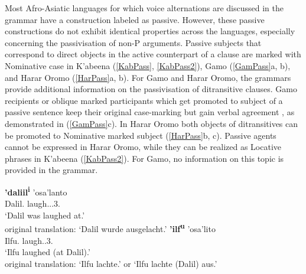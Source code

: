 Most Afro-Asiatic languages for which voice alternations are discussed in the grammar have a construction labeled as passive.
However, these passive constructions do not exhibit identical properties across the languages, especially concerning the passivisation of non-P arguments. 
Passive subjects that correspond to direct objects in the active counterpart of a clause are mark\-ed with Nominative  case in K'abeena (\ref{KabPass}, \ref{KabPass2}), Gamo (\ref{GamPass}a, b), and Harar Oromo (\ref{HarPass}a, b).
For Gamo and Harar Oromo, the grammars provide additional information on the passivisation of ditransitive clauses. 
Gamo recipients or oblique marked participants which get promoted to subject of a passive sentence keep their original case-marking but gain verbal agreement \citep[394]{Hompo:1990}, as demonstrated in (\ref{GamPass}c). 
In Harar Oromo both objects of ditransitives can be promoted to Nominative  marked subject (\ref{HarPass}b, c). 
Passive agents cannot be expressed in Harar Oromo, while they can be realized as Locative phrases in K'abeena (\ref{KabPass2}). 
For Gamo, no information on this topic is provided in the grammar.  

\begin{exe}\ex\label{KabPass}
\begin{xlist}
\ex\gll \textbf{'daliil\textsuperscript{i}} 'osa'lanto\\
Dalil.\nom{} laugh.\pass{}.\pfv{}.3\sg{}.\fem{}\\
\glt `Dalil was laughed at.'\\
\glt original translation: `Dalil wurde ausgelacht.'
\ex\gll \textbf{'ilf\textsuperscript{u}} 'osa'lito\\
Ilfu.\nom{} laugh.\pfv{}.3\sg{}.\fem{}\\
\glt `Ilfu laughed (at Dalil).'\\ 
original translation: `Ilfu lachte.' or `Ilfu lachte (Dalil) aus.'
\end{xlist}
\end{exe}

